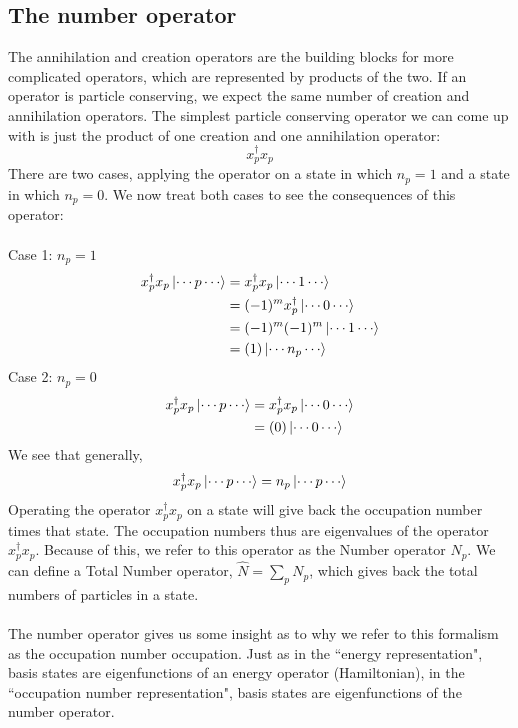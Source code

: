 \documentclass{article}
\begin{document}
\subsection{The number operator}
The annihilation and creation operators are the building blocks for more complicated operators, which are represented by products of the two.
If an operator is particle conserving, we expect the same number of creation and annihilation operators. 
The simplest particle conserving operator we can come up with is just the product of one creation and one annihilation operator: 
\[x_p^\dagger x_p \]
There are two cases, applying the operator on a state in which $n_p = 1$ and a state in which $n_p = 0$.
We now treat both cases to see the consequences of this operator: \\
\\
Case 1: $n_p = 1$ \\
\begin{align*}
x_p^\dagger x_p \ket{\cdots p \cdots} &= x_p^\dagger x_p \ket{\cdots 1 \cdots} \\
&= (-1)^m x_p^\dagger \ket{\cdots 0 \cdots} \\
&= (-1)^m (-1)^m \ket{\cdots 1 \cdots}  \\
&= (1) \ket{\cdots n_p \cdots}  \\
\end{align*}
Case 2: $n_p = 0$ \\
\begin{align*}
x_p^\dagger x_p \ket{\cdots p \cdots} &= x_p^\dagger x_p \ket{\cdots 0 \cdots} \\
&= (0)\ket{\cdots 0 \cdots} \\
\end{align*}
We see that generally, 
\[x_p^\dagger x_p \ket{\cdots p \cdots} = n_p\ket{\cdots p \cdots}  \]
Operating the operator $x_p^\dagger x_p$ on a state will give back the occupation number times that state.
The occupation numbers thus are eigenvalues of the operator $x_p^\dagger x_p$. 
Because of this, we refer to this operator as the Number operator $N_p$. 
We can define a Total Number operator, $\hat{N} = \sum_p N_p$, which gives back the total numbers of particles in a state. \\
\\
The number operator gives us some insight as to why we refer to this formalism as the occupation number occupation.
Just as in the ``energy representation", basis states are eigenfunctions of an energy operator (Hamiltonian),
in the ``occupation number representation", basis states are eigenfunctions of the number operator. 
\end{document}
